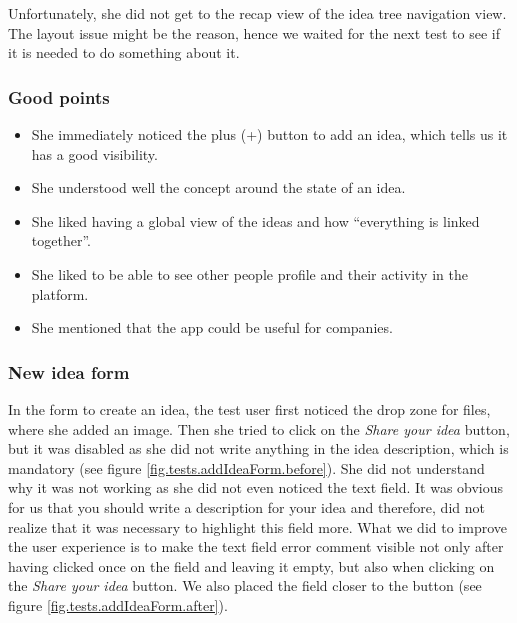 \documentclass[a4paper,12pt,twoside]{article}
\begin{document}
Unfortunately, she did not get to the recap view of the idea tree navigation view.
The layout issue might be the reason, hence we waited for the next test to see if it is needed to do something about it.

\subsubsection*{Good points}
\begin{itemize}
    \item She immediately noticed the plus (+) button to add an idea, which tells us it has a good visibility.
    \item She understood well the concept around the state of an idea.
    \item She liked having a global view of the ideas and how “everything is linked together”.
    \item She liked to be able to see other people profile and their activity in the platform.
    \item She mentioned that the app could be useful for companies.
\end{itemize}

\subsubsection*{New idea form}
In the form to create an idea, the test user first noticed the drop zone for files, where she added an image.
Then she tried to click on the \emph{Share your idea} button, but it was disabled as she did not write anything in the idea description, which is mandatory (see figure \ref{fig.tests.addIdeaForm.before}).
She did not understand why it was not working as she did not even noticed the text field.
It was obvious for us that you should write a description for your idea and therefore, did not realize that it was necessary to highlight this field more.
What we did to improve the user experience is to make the text field error comment visible not only after having clicked once on the field and leaving it empty, but also when clicking on the \emph{Share your idea} button.
We also placed the field closer to the button (see figure \ref{fig.tests.addIdeaForm.after}).
\end{document}
